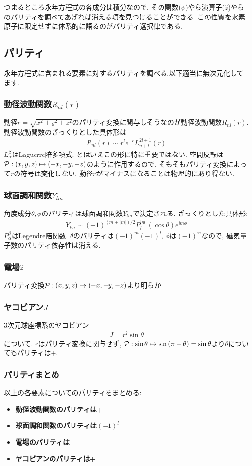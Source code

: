 \documentclass[10.5pt,a4paper]{jreport}
\begin{document}
つまるところ永年方程式の各成分は積分なので, その関数($\psi$)やら演算子($\hat{z}$)やらのパリティを調べてあげれば消える項を見つけることができる. この性質を水素原子に限定せずに体系的に語るのがパリティ選択律である.
\subsection{パリティ}
永年方程式に含まれる要素に対するパリティを調べる.以下適当に無次元化してます.
\subsubsection{動径波動関数$R_{nl}(r)$}
動径$r = \sqrt{x^2 + y^2 + z^2}$のパリティ変換に関与しそうなのが動径波動関数$R_{nl}(r)$. 動径波動関数のざっくりとした具体形は
\begin{eqnarray}
  R_{nl}(r) \sim r^le^{-r}L_{n+l}^{2l+1}(r)
\end{eqnarray}
$L_\alpha^\beta$はLaguerre陪多項式. とはいえこの形に特に重要ではない. 空間反転は${\cal P}:(x, y, z)\mapsto (-x, -y, -z)$のように作用するので, そもそもパリティ変換によって$r$の符号は変化しない. 動径$r$がマイナスになることは物理的にあり得ない.\\
\subsubsection{球面調和関数$Y_{lm}$}
角度成分$\theta, \phi$のパリティは球面調和関数$Y_{lm}$で決定される. ざっくりとした具体形:
\begin{eqnarray}
  Y_{lm} \sim (-1)^{(m+|m|)/2}P_l^{|m|}(\cos{\theta})e^{im\phi}
\end{eqnarray}
$P_\alpha^\beta$はLegendre陪関数. $\theta$のパリティは$(-1)^m(-1)^l$, $\phi$は$(-1)^m$なので, 磁気量子数のパリティ依存性は消える.
\subsubsection{電場$\hat{z}$}
パリティ変換${\cal P}:(x, y, z)\mapsto(-x, -y, -z)$より明らか.
\subsubsection{ヤコビアン$J$}
3次元球座標系のヤコビアン
\begin{eqnarray}
  J = r^2\sin{\theta}
\end{eqnarray}
について. $r$はパリティ変換に関与せず, ${\cal P}:\sin{\theta} \mapsto \sin{(\pi - \theta)} = \sin{\theta}$より$\theta$についてもパリティは+.
\subsubsection{パリティまとめ}
以上の各要素についてのパリティをまとめる:
\begin{itemize}
\item \textbf{動径波動関数のパリティは+}
  
\item \textbf{球面調和関数のパリティは$(-1)^l$}
  
\item \textbf{電場のパリティは$-$}
  
\item \textbf{ヤコビアンのパリティは+}
\end{itemize}
\end{document}
